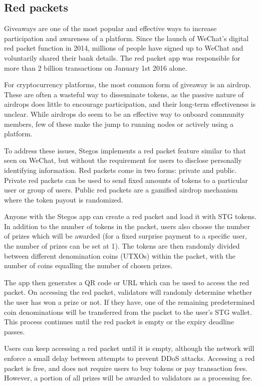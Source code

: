 \documentclass[8pt,fleqn,openany]{book}
\begin{document}
	\subsection{Red packets}\label{sec:red-packets}
	Giveaways are one of the most popular and effective ways to increase participation and awareness of a platform. Since the launch of WeChat’s digital red packet function in 2014, millions of people have signed up to WeChat and voluntarily shared their bank details. The red packet app was responsible for more than 2 billion transactions on January 1st 2016 alone.
	
	For cryptocurrency platforms, the most common form of giveaway is an airdrop. These are often a wasteful way to disseminate tokens, as the passive nature of airdrops does little to encourage participation, and their long-term effectiveness is unclear. While airdrops do seem to be an effective way to onboard community members, few of these make the jump to running nodes or actively using a platform.
	
	To address these issues, Stegos implements a red packet feature similar to that seen on WeChat, but without the requirement for users to disclose personally identifying information. Red packets come in two forms: private and public. Private red packets can be used to send fixed amounts of tokens to a particular user or group of users. Public red packets are a gamified airdrop mechanism where the token payout is randomized.
	
	Anyone with the Stegos app can create a red packet and load it with STG tokens. In addition to the number of tokens in the packet, users also choose the number of prizes which will be awarded (for a fixed surprise payment to a specific user, the number of prizes can be set at 1). The tokens are then randomly divided between different denomination coins (UTXOs) within the packet, with the number of coins equalling the number of chosen prizes. 
	
	The app then generates a QR code or URL which can be used to access the red packet. On accessing the red packet, validators will randomly determine whether the user has won a prize or not. If they have, one of the remaining predetermined coin denominations will be transferred from the packet to the user’s STG wallet. This process continues until the red packet is empty or the expiry deadline passes.
	
	Users can keep accessing a red packet until it is empty, although the network will enforce a small delay between attempts to prevent DDoS attacks. Accessing a red packet is free, and does not require users to buy tokens or pay transaction fees. However, a portion of all prizes will be awarded to validators as a processing fee.
	
\end{document}
